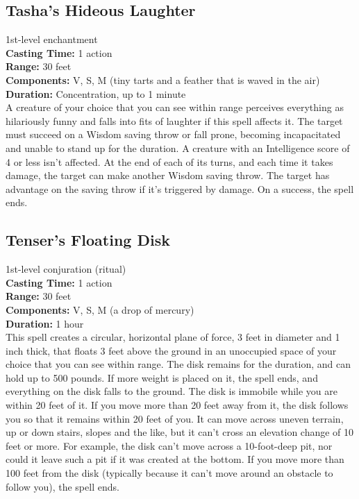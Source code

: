 \documentclass[11pt, A4paper, english]{article}
\begin{document}
		\subsection{Tasha’s Hideous Laughter}
1st-level enchantment \\
\textbf{Casting Time:} 1 action \\
\textbf{Range:} 30 feet \\
\textbf{Components:} V, S, M (tiny tarts and a feather that is waved in the air) \\
\textbf{Duration:} Concentration, up to 1 minute \\
A creature of your choice that you can see within range perceives everything as hilariously funny and falls into fits of laughter if this spell affects it. The target must succeed on a Wisdom  saving throw or fall prone, becoming incapacitated and unable to stand up for the duration. A creature with an Intelligence score of 4 or less isn’t affected. At the end of each of its turns, and each time it takes damage, the target can make another Wisdom  saving throw. The target has advantage on the saving throw if it’s triggered by damage. On a success, the spell ends.

		\subsection{Tenser’s Floating Disk}
1st-level conjuration (ritual) \\
\textbf{Casting Time:} 1 action \\
\textbf{Range:} 30 feet \\
\textbf{Components:} V, S, M (a drop of mercury) \\
\textbf{Duration:} 1 hour \\
This spell creates a circular, horizontal plane of force, 3 feet in diameter and 1 inch thick, that floats 3 feet above the ground in an unoccupied space of your choice that you can see within range. The disk remains for the duration, and can hold up to 500 pounds. If more weight is placed on it, the spell ends, and everything on the disk falls to the ground. The disk is immobile while you are within 20 feet of it. If you move more than 20 feet away from it, the disk follows you so that it remains within 20 feet of you. It can move across uneven terrain, up or down stairs, slopes and the like, but it can’t cross an elevation change of 10 feet or more. For example, the disk can’t move across a  10-foot-deep pit, nor could it leave such a pit if it was created at the bottom. If you move more than  100 feet from the disk (typically because it can’t move around an obstacle to follow you), the spell ends.
\end{document}
